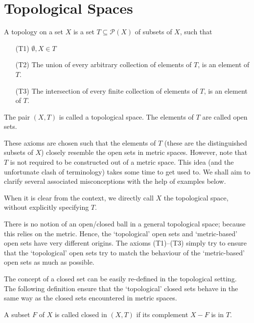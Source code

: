 \section{Topological Spaces}
\begin{ndfn}
  A topology on a set $X$ is a set $T \subseteq \mathcal{P}(X)$ of subsets of $X$, such that
  \begin{enumerate}
  \item[(T1)] $\emptyset, X \in T$
  \item[(T2)] The union of every arbitrary collection of elements of $T$, is an element of $T$.
  \item[(T3)] The intersection of every finite collection of elements of $T$, is an element of $T$.
  \end{enumerate}
  The pair $(X,T)$ is called a topological space. The elements of $T$ are called open sets.
\end{ndfn}

These axioms are chosen such that the elements of $T$ (these are the distinguished subsets of $X$) closely resemble the open sets in metric spaces. However, note that $T$ is not required to be constructed out of a metric space. This idea (and the unfortunate clash of terminology) takes some time to get used to. We shall aim to clarify several associated misconceptions with the help of examples below.

\begin{remark}
  When it is clear from the context, we directly call $X$ the topological space, without explicitly specifying $T$.
\end{remark}

\begin{remark}
  There is no notion of an open/closed ball in a general topological space; because this relies on the metric. Hence, the `topological' open sets and `metric-based' open sets have very different origins. The axioms (T1)--(T3) simply try to ensure that the `topological' open sets try to match the behaviour of the `metric-based' open sets as much as possible.
\end{remark}

The concept of a closed set can be easily re-defined in the topological setting. The following definition ensure that the `topological' closed sets behave in the same way as the closed sets encountered in metric spaces.
\begin{ndfn}
  A subset $F$ of $X$ is called closed in $(X,T)$ if its complement $X-F$ is in $T$.
\end{ndfn}

